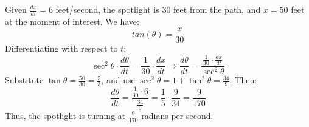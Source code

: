 \documentclass[12pt]{article}
\begin{document}
\begin{enumerate}[start=1,label={\bfseries. },leftmargin=1in]
Given \( \frac{dx}{dt} = 6 \) feet/second, the spotlight is 30 feet from the path, and \( x = 50 \) feet at the moment of interest. We have: 
\[
tan (\theta) = \frac{x}{30} 
\]
Differentiating with respect to \( t \): 
\[
\sec^2 \theta \cdot \frac{d\theta}{dt} = \frac{1}{30} \cdot \frac{dx}{dt} \Rightarrow \frac{d\theta}{dt} = \frac{\frac{1}{30} \cdot \frac{dx}{dt}}{\sec^2 \theta}
\]
Substitute \( \tan \theta = \frac{50}{30} = \frac{5}{3} \), and use \( \sec^2 \theta = 1 + \tan^2 \theta = \frac{34}{9} \). Then:
\[
\frac{d\theta}{dt} = \frac{\frac{1}{30} \cdot 6}{\frac{34}{9}} = \frac{1}{5} \cdot \frac{9}{34} = \frac{9}{170}
\]
Thus, the spotlight is turning at \( \frac{9}{170} \) radians per second.

\end{enumerate} 
\end{document}
